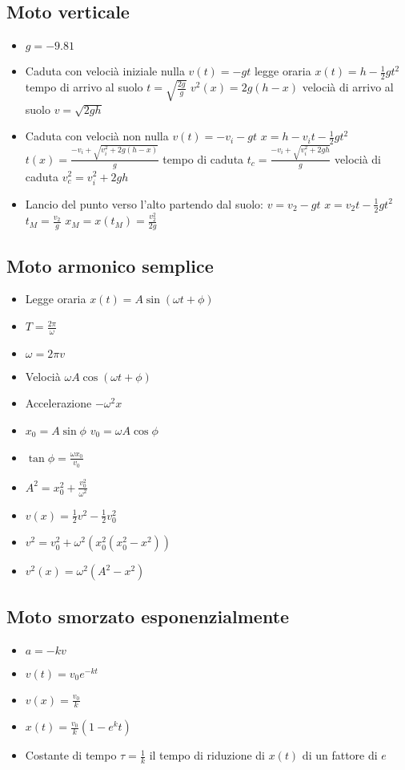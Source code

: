 	\subsection{Moto verticale}
	\begin{itemize}
		\item $g=-9.81$
		\item Caduta con veloci\`a iniziale nulla $v(t) = -gt$ legge oraria $x(t) = h - \frac{1}{2}gt^2$ tempo di arrivo al suolo $t = \sqrt{\frac{2g}{g}}$ $v^2(x) = 2g(h-x)$ veloci\`a di arrivo al suolo $v=\sqrt{2gh}$
		\item Caduta con veloci\`a non nulla $v(t) =-v_i -gt$ $x=h-v_it-\frac{1}{2}gt^2$ $t(x) = \frac{-v_i + \sqrt{v_i^2+2g(h-x)}}{g}$ tempo di caduta $t_c = \frac{-v_i + \sqrt{v_i^2+2gh}}{g}$ veloci\`a di caduta $v_c^2 = v_i^2 + 2gh$
		\item Lancio del punto verso l'alto partendo dal suolo: $v = v_2 - gt$ $x = v_2t - \frac{1}{2}gt^2$ $t_M = \frac{v_2}{g}$ $x_M = x(t_M) = \frac{v_2^2}{2g}$
	\end{itemize}
	\subsection{Moto armonico semplice}
	\begin{itemize}
		\item Legge oraria $x(t)=A\sin(\omega t+\phi)$
		\item $T = \frac{2\pi}{\omega}$
		\item $\omega = 2\pi v$
		\item Veloci\`a $\omega A\cos(\omega t+\phi)$
		\item Accelerazione $-\omega^2 x$
		\item $x_0 = A\sin\phi$ $v_0 = \omega A\cos \phi$
		\item $\tan\phi = \frac{\omega x_0}{v_0}$
		\item $A^2 = x_0^2 + \frac{v_0^2}{\omega^2}$
		\item $v(x) = \frac{1}{2}v^2-\frac{1}{2}v_0^2$
		\item $v^2 = v_0^2+\omega^2(x_0^2(x_0^2 - x^2))$
		\item $v^2(x) = \omega^2(A^2-x^2)$
	\end{itemize}
	\subsection{Moto smorzato esponenzialmente}
	\begin{itemize}
		\item $a = -kv$
		\item $v(t)=v_0e^{-kt}$
		\item $v(x) = \frac{v_0}{k}$
		\item $x(t) = \frac{v_0}{k}(1-e^{k}t)$
		\item Costante di tempo $\tau=\frac{1}{k}$ il tempo di riduzione di $x(t)$ di un fattore di $e$
	\end{itemize}
